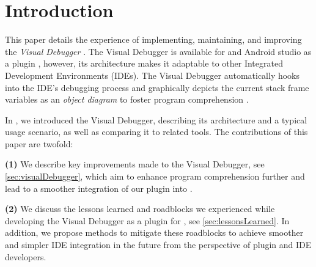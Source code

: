 \documentclass[sigconf]{acmart}
\begin{document}


\maketitle

\renewcommand\UrlFont{\color{blue}}

\section{Introduction}
This paper details the experience of implementing, maintaining, and improving the \textit{Visual Debugger} \cite{krauterVisualDebuggerTool2022}.
The Visual Debugger is available for \intellij{} and Android studio as a plugin \cite{timkrauterVisualDebuggerIntelliJ2023}, however, its architecture makes it adaptable to other Integrated Development Environments (IDEs).
The Visual Debugger automatically hooks into the IDE's debugging process and graphically depicts the current stack frame variables as an \textit{object diagram} to foster program comprehension \cite{krauterVisualDebuggerTool2022}.

In \cite{krauterVisualDebuggerTool2022}, we introduced the Visual Debugger, describing its architecture and a typical usage scenario, as well as comparing it to related tools.
The contributions of this paper are twofold:

\textbf{(1)} We describe key improvements made to the Visual Debugger, see \autoref{sec:visualDebugger}, which aim to enhance program comprehension further and lead to a smoother integration of our plugin into \intellij{}.

\textbf{(2)} We discuss the lessons learned and roadblocks we experienced while developing the Visual Debugger as a plugin for \intellij{}, see \autoref{sec:lessonsLearned}.
In addition, we propose methods to mitigate these roadblocks to achieve smoother and simpler IDE integration in the future from the perspective of plugin and IDE developers. 
\end{document}
